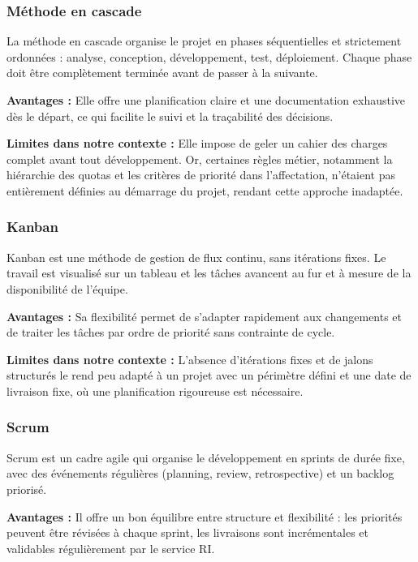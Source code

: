 \subsubsection{Méthode en cascade}

La méthode en cascade organise le projet en phases séquentielles et strictement
ordonnées : analyse, conception, développement, test, déploiement. Chaque phase
doit être complètement terminée avant de passer à la suivante.

\textbf{Avantages :} Elle offre une planification claire et une documentation
exhaustive dès le départ, ce qui facilite le suivi et la traçabilité des décisions.

\textbf{Limites dans notre contexte :} Elle impose de geler un cahier des charges
complet avant tout développement. Or, certaines règles métier, notamment la
hiérarchie des quotas et les critères de priorité dans l'affectation, n'étaient
pas entièrement définies au démarrage du projet, rendant cette approche inadaptée.

\subsubsection{Kanban}

Kanban est une méthode de gestion de flux continu, sans itérations fixes. Le
travail est visualisé sur un tableau et les tâches avancent au fur et à mesure
de la disponibilité de l'équipe.

\textbf{Avantages :} Sa flexibilité permet de s'adapter rapidement aux changements
et de traiter les tâches par ordre de priorité sans contrainte de cycle.

\textbf{Limites dans notre contexte :} L'absence d'itérations fixes et de
jalons structurés le rend peu adapté à un projet avec un périmètre défini et
une date de livraison fixe, où une planification rigoureuse est nécessaire.

\subsubsection{Scrum}

Scrum est un cadre agile qui organise le développement en sprints de durée fixe,
avec des événements régulières (planning, review, retrospective) et un backlog
priorisé.

\textbf{Avantages :} Il offre un bon équilibre entre structure et flexibilité :
les priorités peuvent être révisées à chaque sprint, les livraisons sont
incrémentales et validables régulièrement par le service RI.

